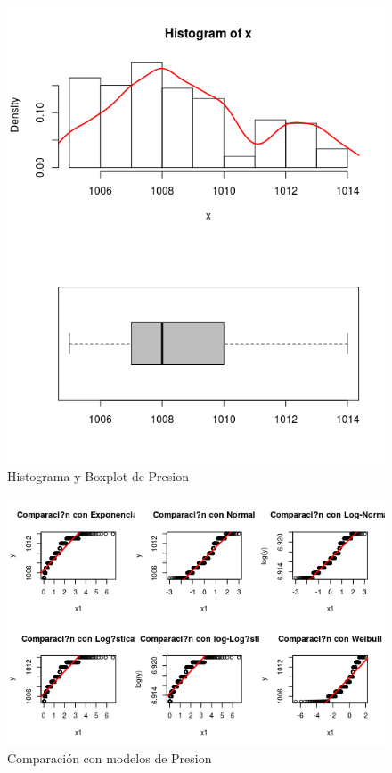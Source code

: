\documentclass{article}
\begin{document}
\begin{enumerate}[a)]
\begin{figure}[h!]
\centering
\includegraphics[scale=0.5]{./figures/histplot_Presion.png}
\caption{Histograma y Boxplot de Presion}
\end{figure}

\begin{figure}[h!]
\centering
\includegraphics[scale=0.5]{./figures/cm_Presion.png}
\caption{Comparación con modelos de Presion}
\end{figure}


\end{enumerate}
\end{document}
